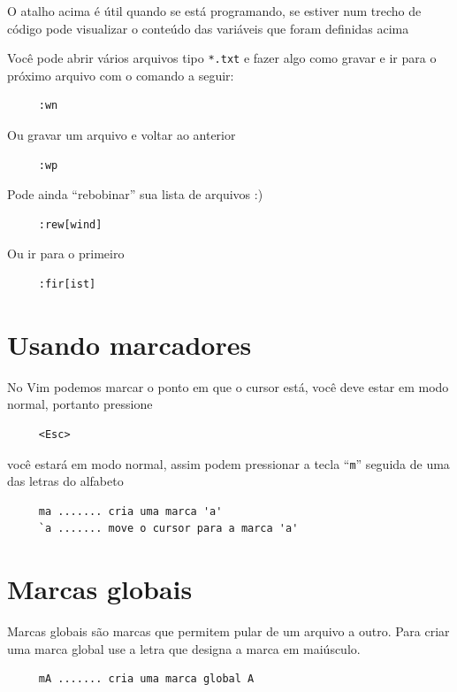 \documentclass[10pt,a4paper,openany]{book}
\begin{document}
O atalho acima é útil quando se está programando, se estiver num
trecho de código pode visualizar o conteúdo das variáveis que foram
definidas acima

Você pode abrir vários arquivos tipo \verb|*.txt| e fazer
algo como gravar e ir para o próximo arquivo com o comando a
seguir:

\begin{verbatim}
     :wn
\end{verbatim}

Ou gravar um arquivo e voltar ao anterior

\begin{verbatim}
     :wp
\end{verbatim}

Pode ainda ``rebobinar'' sua lista de arquivos :)

\begin{verbatim}
     :rew[wind]
\end{verbatim}

Ou ir para o primeiro

\begin{verbatim}
     :fir[ist]
\end{verbatim}

\section{Usando marcadores}
\label{Usando marcadores}

No Vim podemos marcar o ponto em que o cursor está, você deve estar em
modo normal, portanto pressione

\begin{verbatim}
     <Esc>
\end{verbatim}

você estará em modo normal, assim podem pressionar a tecla ``\verb+m+''
seguida de uma das letras do alfabeto

\begin{verbatim}
     ma ....... cria uma marca 'a'
     `a ....... move o cursor para a marca 'a'
\end{verbatim}

\section{Marcas globais}
\label{Marcas globais}
Marcas globais são marcas que permitem pular de um arquivo a outro.
Para criar uma marca global use a letra que designa a marca em
maiúsculo.

\begin{verbatim}
     mA ....... cria uma marca global A
\end{verbatim}
\end{document}
